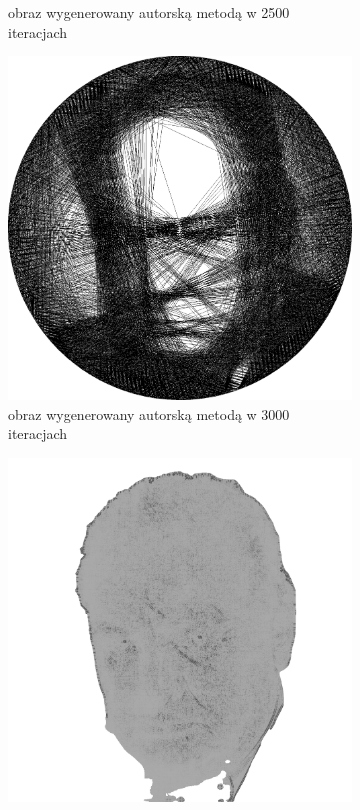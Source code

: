 \documentclass[a4paper, 12pt, polish, twoside]{extreport}
\begin{document}
\begin{figure}[H]
\begin{subfigure}{0.30\textwidth}
        \caption{obraz wygenerowany autorską metodą w 2500 iteracjach}
        \label{comp-comp-churchill-d}
    \end{subfigure}
    \begin{subfigure}{0.30\textwidth}
        \centering
        \includegraphics[width = \textwidth]{img/6-comp/churchill_e_i3000_c20_inv0_bg1_obj1_ed1.png}
        \caption{obraz wygenerowany autorską metodą w 3000 iteracjach}
        \label{comp-comp-churchill-e}
    \end{subfigure}
    \begin{subfigure}{0.30\textwidth}
        \centering
        \includegraphics[width = \textwidth]{img/6-comp/churchill_mask_c20_inv0_bg1_obj2_ed1.png}

\end{subfigure}
\end{figure}
\end{document}
